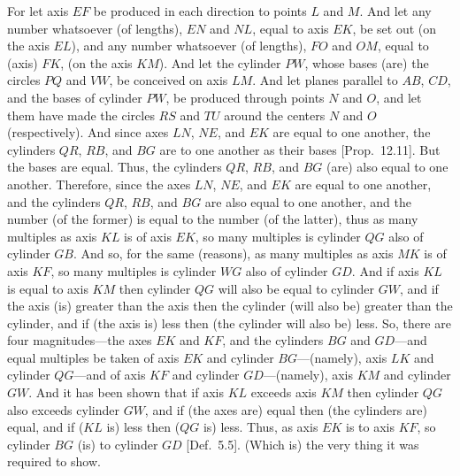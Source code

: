 \begin{Parallel}{}{}
{For let axis $EF$ be produced in each direction to points $L$ and $M$. And let any number whatsoever (of
lengths), $EN$ and $NL$, equal to axis $EK$, be set out (on the axis $EL$), and any number whatsoever
(of lengths), $FO$ and $OM$, equal to (axis) $FK$, (on the axis $KM$). And let the cylinder $PW$, whose bases
(are) the circles $PQ$ and $VW$, be
conceived on axis $LM$. And let planes parallel to $AB$, $CD$, and the bases of cylinder $PW$, be produced
through points $N$ and $O$, and let them have made the circles $RS$ and $TU$ around the centers $N$ and $O$ (respectively).
And since axes $LN$, $NE$, and $EK$ are equal to one another,  the cylinders $QR$, $RB$, and $BG$ are to one another
as their bases [Prop.~12.11]. But the bases are equal. Thus, the cylinders $QR$, $RB$, and $BG$
(are) also equal to one another. Therefore, since the axes $LN$, $NE$, and $EK$ are equal to one another, and the cylinders
$QR$, $RB$, and $BG$ are also equal to one another, and the number (of the former) is equal to the number (of the latter), 
thus as many multiples as axis $KL$ is of axis $EK$, so many multiples is cylinder $QG$ also of cylinder $GB$.
And so, for the same (reasons),  as many multiples as axis $MK$  is of axis $KF$, so many multiples is cylinder $WG$
also of cylinder $GD$.  And if axis $KL$ is equal to axis $KM$ then cylinder $QG$ will also be equal to
cylinder $GW$, and if the axis (is) greater than the axis then the cylinder (will also be) greater than the cylinder, and if (the axis is) less
then (the cylinder will also be) less. So, there are four magnitudes---the axes $EK$ and $KF$, and the cylinders
$BG$ and $GD$---and equal multiples be taken of axis $EK$ and 
cylinder $BG$---(namely), axis $LK$ and
cylinder $QG$---and of axis $KF$
 and  cylinder $GD$---(namely), axis
$KM$ and  cylinder $GW$. And it has been shown that if axis $KL$ exceeds axis $KM$ then cylinder
$QG$ also exceeds  cylinder $GW$, and if (the axes are) equal then (the cylinders are) equal, and if ($KL$ is) less then ($QG$ is) less.
Thus, as axis $EK$ is to axis $KF$, so cylinder $BG$ (is) to cylinder $GD$ [Def.~5.5]. (Which is)
the very thing it was required to show.}
\end{Parallel}

